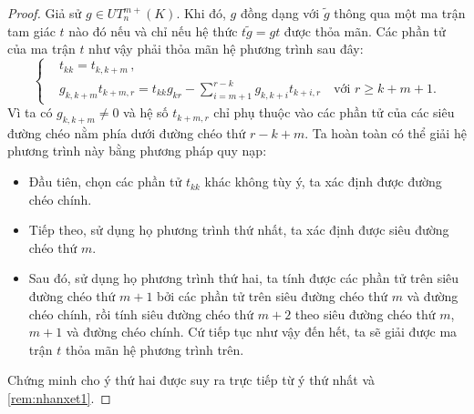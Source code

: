 \begin{proof}
Giả sử $g \in UT_n^{m+}(K)$. Khi đó, $g$ đồng dạng với $\tilde{g}$ thông qua một ma trận tam giác $t$ nào đó nếu và chỉ nếu hệ thức $t\tilde{g} = gt$ được thỏa mãn. Các phần tử của ma trận $t$ như vậy phải thỏa mãn hệ phương trình sau đây:
\begin{equation*}
\left\{
\begin{aligned}
&t_{kk} = t_{k, k+m}\,, \\
&g_{k, k+m} t_{k+m, r} = t_{kk} g_{kr} - \sum_{i=m+1}^{r-k} g_{k, k+i} t_{k+i, r} \quad \text{với } r \ge k+m+1.
\end{aligned}
\right.
\end{equation*}
Vì ta có $g_{k, k+m} \neq 0$ và hệ số $t_{k+m, r}$ chỉ phụ thuộc vào các phần tử của các siêu đường chéo nằm phía dưới đường chéo thứ $r-k+m$. Ta hoàn toàn có thể giải hệ phương trình này bằng phương pháp quy nạp: 
\begin{itemize}
    \item Đầu tiên, chọn các phần tử $t_{kk}$ khác không tùy ý, ta xác định được đường chéo chính. 
    \item Tiếp theo, sử dụng họ phương trình thứ nhất, ta xác định được siêu đường chéo thứ $m$.
    \item Sau đó, sử dụng họ phương trình thứ hai, ta tính được các phần tử trên siêu đường chéo thứ $m+1$ bởi các phần tử trên siêu đường chéo thứ $m$ và đường chéo chính, rồi tính siêu đường chéo thứ $m+2$ theo siêu đường chéo thứ $m$, $m+1$ và đường chéo chính. Cứ tiếp tục như vậy đến hết, ta sẽ giải được ma trận $t$ thỏa mãn hệ phương trình trên.
\end{itemize}
Chứng minh cho ý thứ hai được suy ra trực tiếp từ ý thứ nhất và \cref{rem:nhanxet1}.
\end{proof}

